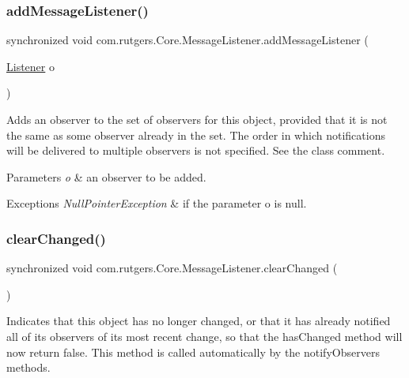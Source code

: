 \subsubsection{\texorpdfstring{add\+Message\+Listener()}{addMessageListener()}}
{\footnotesize\ttfamily synchronized void com.\+rutgers.\+Core.\+Message\+Listener.\+add\+Message\+Listener (\begin{DoxyParamCaption}\item[{\hyperlink{interfacecom_1_1rutgers_1_1Core_1_1Listener}{Listener}}]{o }\end{DoxyParamCaption})}

Adds an observer to the set of observers for this object, provided that it is not the same as some observer already in the set. The order in which notifications will be delivered to multiple observers is not specified. See the class comment.


\begin{DoxyParams}{Parameters}
{\em o} & an observer to be added. \\
\hline
\end{DoxyParams}

\begin{DoxyExceptions}{Exceptions}
{\em Null\+Pointer\+Exception} & if the parameter o is null. \\
\hline
\end{DoxyExceptions}
\mbox{\label{classcom_1_1rutgers_1_1Core_1_1MessageListener_ad677331c0373ba3a7907119a35ce3a8f}} 
\subsubsection{\texorpdfstring{clear\+Changed()}{clearChanged()}}
{\footnotesize\ttfamily synchronized void com.\+rutgers.\+Core.\+Message\+Listener.\+clear\+Changed (\begin{DoxyParamCaption}{ }\end{DoxyParamCaption})\hspace{0.3cm}{\ttfamily [protected]}}

Indicates that this object has no longer changed, or that it has already notified all of its observers of its most recent change, so that the {\ttfamily has\+Changed} method will now return {\ttfamily false}. This method is called automatically by the {\ttfamily notify\+Observers} methods.

